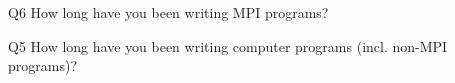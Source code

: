 \begin{description}%
\item{Q6} How long have you been writing MPI programs?%
\item{Q5} How long have you been writing computer programs (incl. non-MPI programs)?%
\end{description}%
